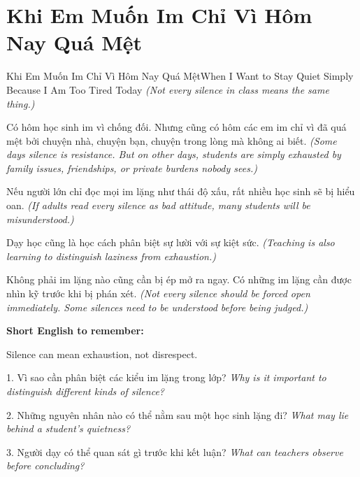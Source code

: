 \section{Khi Em Muốn Im Chỉ Vì Hôm Nay Quá Mệt}
\begin{truyen}{Khi Em Muốn Im Chỉ Vì Hôm Nay Quá Mệt}{When I Want to Stay Quiet Simply Because I Am Too Tired Today}
\textit{(Not every silence in class means the same thing.)}

Có hôm học sinh im vì chống đối. Nhưng cũng có hôm các em im chỉ vì đã quá mệt bởi chuyện nhà, chuyện bạn, chuyện trong lòng mà không ai biết.
\textit{(Some days silence is resistance. But on other days, students are simply exhausted by family issues, friendships, or private burdens nobody sees.)}

Nếu người lớn chỉ đọc mọi im lặng như thái độ xấu, rất nhiều học sinh sẽ bị hiểu oan.
\textit{(If adults read every silence as bad attitude, many students will be misunderstood.)}

Dạy học cũng là học cách phân biệt sự lười với sự kiệt sức.
\textit{(Teaching is also learning to distinguish laziness from exhaustion.)}
\end{truyen}

\begin{baihoc}
Không phải im lặng nào cũng cần bị ép mở ra ngay. Có những im lặng cần được nhìn kỹ trước khi bị phán xét.
\textit{(Not every silence should be forced open immediately. Some silences need to be understood before being judged.)}
\end{baihoc}

\begin{ghinhoanh}
\textbf{Short English to remember:}

Silence can mean exhaustion, not disrespect.

\end{ghinhoanh}

\begin{tuhocnhanh}
1. Vì sao cần phân biệt các kiểu im lặng trong lớp? \textit{Why is it important to distinguish different kinds of silence?}

2. Những nguyên nhân nào có thể nằm sau một học sinh lặng đi? \textit{What may lie behind a student's quietness?}

3. Người dạy có thể quan sát gì trước khi kết luận? \textit{What can teachers observe before concluding?}
\end{tuhocnhanh}
\ngancach

